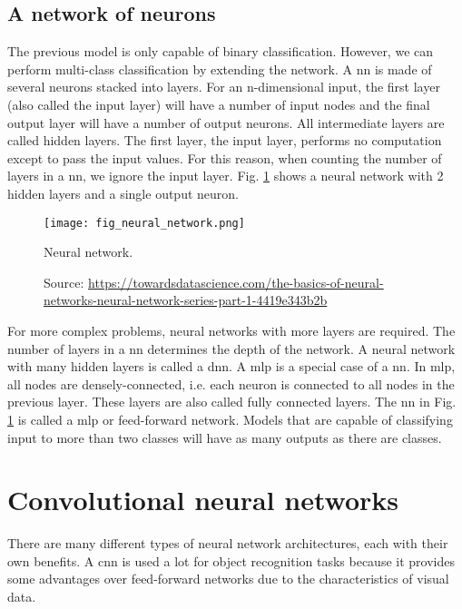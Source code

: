 \subsection{A network of neurons}
The previous model is only capable of binary classification. However, we can perform multi-class classification by extending the network. A \acrfull{nn} is made of several neurons stacked into layers. For an n-dimensional input, the first layer (also called the input layer) will have a number of input nodes and the final output layer will have a number of output neurons. All intermediate layers are called hidden layers. The first layer, the input layer, performs no computation except to pass the input values. For this reason, when counting the number of layers in a \acrshort{nn}, we ignore the input layer. Fig. \ref{fig:neural_network} shows a neural network with 2 hidden layers and a single output neuron. 
\begin{figure}[ht]
    \begin{center}
    \texttt{[image: fig\_neural\_network.png]}
    \caption[Neural network]{Neural network.}
    \caption*{Source: \href{https://towardsdatascience.com/the-basics-of-neural-networks-neural-network-series-part-1-4419e343b2b}{https://towardsdatascience.com/the-basics-of-neural-networks-neural-network-series-part-1-4419e343b2b}}
    \label{fig:neural_network}
    \end{center}
\end{figure}

For more complex problems, neural networks with more layers are required. The number of layers in a \acrshort{nn} determines the depth of the network. A neural network with many hidden layers is called a \acrfull{dnn}. 
A \acrfull{mlp} \cite{hornik1989multilayer} is a special case of a \acrshort{nn}. In \acrshort{mlp}, all nodes are densely-connected, i.e. each neuron is connected to all nodes in the previous layer. These layers are also called fully connected layers. The \acrshort{nn} in Fig. \ref{fig:neural_network} is called a \acrshort{mlp} or feed-forward network. Models that are capable of classifying input to more than two classes will have as many outputs as there are classes.

\section{Convolutional neural networks}
There are many different types of neural network architectures, each with their own benefits. A \acrfull{cnn} is used a lot for object recognition tasks because it provides some advantages over feed-forward networks due to the characteristics of visual data.

